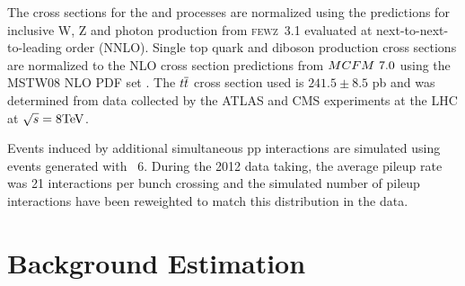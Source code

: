The cross sections for the \vjets and \gjets processes
 are normalized using the predictions
 for inclusive W, Z and photon production from
 \textsc{fewz~3.1} \cite {Gavin:2012sy,ref:FEWZ3.1}
 evaluated at next-to-next-to-leading order (NNLO).
Single top quark and diboson production cross sections are
 normalized to the NLO
 cross section predictions from ${MCFM}~7.0$ \cite {Campbell:2010ff, Badger:2010mg}
 using the MSTW08 NLO PDF set \cite{Martin:2009iq}.
The $t\overline{t}$ cross section used is $241.5\pm8.5$ pb and
 was determined from data collected by the ATLAS and CMS
 experiments \cite{CMS:2014gta,Aad:2014kva,Chatrchyan:2013faa}
 at the LHC at $\sqrt{s}=8\mathrm{TeV}$.


Events induced by additional simultaneous pp interactions
 are simulated using events generated with \textsc{\PYTHIA~6}.
During the 2012 data taking, the average pileup rate was
 21 interactions per bunch crossing and
 the simulated number of pileup interactions
 have been reweighted to match this distribution in the data.


\section{Background Estimation}

